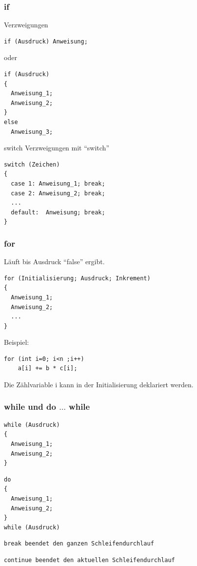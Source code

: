 \documentclass[10pt]{beamer}
\begin{document}
\begin{frame}[fragile]
  \frametitle{if}
Verzweigungen
\begin{lstlisting}
if (Ausdruck) Anweisung;
\end{lstlisting}
oder
\begin{lstlisting}
if (Ausdruck)
{
  Anweisung_1;
  Anweisung_2;
}
else
  Anweisung_3;
\end{lstlisting}
\end{frame}

\begin{frame}[fragile]{switch}
Verzweigungen mit ``switch''
\begin{lstlisting}
switch (Zeichen)
{
  case 1: Anweisung_1; break;
  case 2: Anweisung_2; break;
  ...
  default:  Anweisung; break;
}
\end{lstlisting}
\end{frame}

\begin{frame}[fragile]
  \frametitle{for}

Läuft bis Ausdruck ``false'' ergibt.
\begin{lstlisting}
for (Initialisierung; Ausdruck; Inkrement)
{
  Anweisung_1;
  Anweisung_2;
  ...
}
\end{lstlisting}

Beispiel:
\begin{lstlisting}
for (int i=0; i<n ;i++)
    a[i] += b * c[i];
\end{lstlisting}
Die Zählvariable i kann in der Initialisierung deklariert werden.

\end{frame}

\begin{frame}[fragile]
  \frametitle{while und do $\ldots$ while}
\begin{lstlisting}
while (Ausdruck)
{
  Anweisung_1;
  Anweisung_2;
}
\end{lstlisting}

\begin{lstlisting}
do
{
  Anweisung_1;
  Anweisung_2;
}
while (Ausdruck)
\end{lstlisting}

\begin{lstlisting}
break beendet den ganzen Schleifendurchlauf
\end{lstlisting}
\begin{lstlisting}
continue beendet den aktuellen Schleifendurchlauf
\end{lstlisting}

\end{frame}
\end{document}
